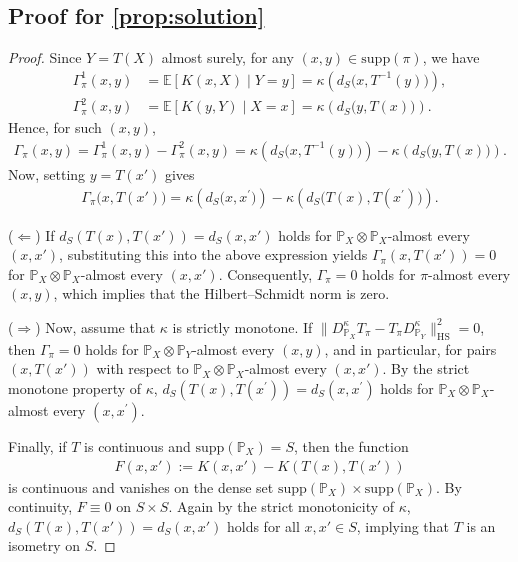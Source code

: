 \documentclass{article}
\begin{document}
\subsection{Proof for \cref{prop:solution}}\label{pf:prop:solution}
\begin{proof}
	Since $Y = T(X)$ almost surely, for any $(x,y) \in \mathrm{supp}(\pi)$, we have
	\begin{align*}
		\Gamma_\pi^1(x,y) &= \mathbb{E}[K(x,X)\mid Y=y] = \kappa\left(d_S\bigl(x,T^{-1}(y)\bigr)\right), \\
		\Gamma_\pi^2(x,y) &= \mathbb{E}[K(y,Y)\mid X=x] = \kappa\left(d_S\bigl(y,T(x)\bigr)\right).
	\end{align*}
	Hence, for such $(x,y)$,
	\begin{align*}
		\Gamma_\pi(x,y)
		= \Gamma_\pi^1(x,y) - \Gamma_\pi^2(x,y)
		= \kappa\left(d_S\bigl(x,T^{-1}(y)\bigr)\right) - \kappa\left(d_S\bigl(y,T(x)\bigr)\right) .
	\end{align*}
	Now, setting $y = T(x')$ gives
	\begin{align*}
		\Gamma_\pi\bigl(x,T(x')\bigr)
		= \kappa\left(d_S\bigl(x,x^\prime\bigr)\right) - \kappa\left(d_S\bigl(T(x),T(x^\prime)\bigr)\right) .
	\end{align*}
	
	($\Leftarrow$) If $d_S(T(x),T(x')) = d_S(x,x')$ holds for $\mathbb{P}_X \otimes \mathbb{P}_X$-almost every $(x,x')$, substituting this into the above expression yields $\Gamma_\pi(x,T(x')) = 0$ for $\mathbb{P}_X \otimes \mathbb{P}_X$-almost every $(x,x')$. Consequently, $\Gamma_\pi = 0$ holds for $\pi$-almost every $(x,y)$, which implies that the Hilbert–Schmidt norm is zero.
	
	($\Rightarrow$) Now, assume that $\kappa$ is strictly monotone. If $\|D_{\mathbb{P}_X}^{\kappa}T_\pi - T_\pi D_{\mathbb{P}_Y}^{\kappa}\|_{\mathrm{HS}}^2 = 0$, then $\Gamma_\pi = 0$ holds for $\mathbb{P}_X \otimes \mathbb{P}_Y$-almost every $(x,y)$, and in particular, for pairs $(x,T(x'))$ with respect to $\mathbb{P}_X \otimes \mathbb{P}_X$-almost every $(x,x')$. By the strict monotone property of $\kappa$, $d_S(T(x),T(x^\prime)) = d_S(x,x^\prime)$ holds for $\mathbb{P}_X \otimes \mathbb{P}_X$-almost every $(x,x^\prime)$.
	
	Finally, if $T$ is continuous and $\mathrm{supp}(\mathbb{P}_X) = S$, then the function
	\begin{align*}
		F(x,x') := K(x,x') - K(T(x),T(x'))
	\end{align*}
	is continuous and vanishes on the dense set $\mathrm{supp}(\mathbb{P}_X) \times \mathrm{supp}(\mathbb{P}_X)$.  
	By continuity, $F \equiv 0$ on $S \times S$.
	Again by the strict monotonicity of $\kappa$, $d_S(T(x),T(x')) = d_S(x,x')$ holds for all $x,x' \in S$, implying that $T$ is an isometry on $S$.
\end{proof}
\end{document}
